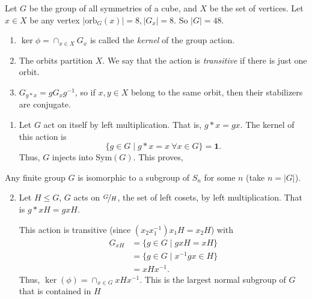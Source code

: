 \begin{example}
    Let \(G\) be the group of all symmetries of a cube, and \(X\) be the set of vertices. Let \(x \in X\) be any vertex \(\left\vert \mathrm{orb}_G(x)\right\vert = 8, \left\vert G_x \right\vert =8  \). So \(\left\vert G \right\vert = 48\).
\end{example}
\begin{remark}
    \begin{enumerate}
        \item \(\ker \phi = \cap_{x\in X} G_x\) is called the \textit{kernel} of the group action.
        \item The orbits partition \(X\). We say that the action is \textit{transitive} if there is just one orbit.
        \item \(G_{g*x} = g G_x g^{-1}\), so if \(x,y \in X\) belong to the same orbit, then their stabilizers are conjugate.
    \end{enumerate}
\end{remark}
\begin{example}
    \leavevmode
    \begin{enumerate}
        \item Let \(G\) act on itself by left multiplication. That is, \(g*x = gx\). The kernel of this action is
    \[
        \{g \in G\mid g*x = x ~\forall x\in G\} = \textbf{1} .
    \]
    Thus, \(G\) injects into \(\mathrm{Sym}(G)\). This proves,
\end{enumerate}
\begin{theorem}
    Any finite group \(G\) is isomorphic to a subgroup of \(S_n\) for some \(n\) (take \(n = \left\vert G \right\vert \)).
\end{theorem}
\begin{enumerate}
    \setcounter{enumi}{1}
\item Let \(H \leq G\), \(G\) acts on \(\nicefrac{G}{H}\), the set of left cosets, by left multiplication. That is \(g*xH = gxH\).

This action is transitive (since \((x_{2}x_1^{-1})x_{1}H = x_2 H \)) with
\begin{align*}
    G_{xH} &= \{g\in G \mid gxH = xH\}\\
    &= \{g\in G \mid x^{-1}gx\in H\}\\
    &= xHx^{-1}.
\end{align*}
Thus, \(\ker(\phi) = \cap_{x\in G} xHx^{-1}\). This is the largest normal subgroup of \(G\) that is contained in \(H\)
\end{enumerate}
\end{example}
